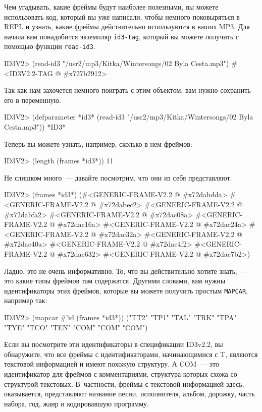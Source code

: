 Чем угадывать, какие фреймы будут наиболее полезными, вы можете использовать код, который
вы уже написали, чтобы немного поковыряться в REPL и узнать, какие фреймы действительно
используютcя в ваших MP3. Для начала вам понадобится экземпляр \lstinline{id3-tag}, который вы
можете получить с помощью функции \lstinline{read-id3}.

\begin{myverb}
ID3V2> (read-id3 "/usr2/mp3/Kitka/Wintersongs/02 Byla Cesta.mp3")
#<ID3V2.2-TAG @ #x727b2912>
\end{myverb}

Так как нам захочется немного поиграть с этим объектом, вам нужно сохранить его в переменную.

\begin{myverb}
ID3V2> (defparameter *id3* (read-id3 "/usr2/mp3/Kitka/Wintersongs/02 Byla Cesta.mp3"))
*ID3*
\end{myverb}

Теперь вы можете узнать, например, сколько в нем фреймов:

\begin{myverb}
ID3V2> (length (frames *id3*))
11
\end{myverb}

Не слишком много~--- давайте посмотрим, что они из себя представляют.

\begin{myverb}
ID3V2> (frames *id3*)
(#<GENERIC-FRAME-V2.2 @ #x72dabdda> #<GENERIC-FRAME-V2.2 @ #x72dabec2>
 #<GENERIC-FRAME-V2.2 @ #x72dabfa2> #<GENERIC-FRAME-V2.2 @ #x72dac08a>
 #<GENERIC-FRAME-V2.2 @ #x72dac16a> #<GENERIC-FRAME-V2.2 @ #x72dac24a>
 #<GENERIC-FRAME-V2.2 @ #x72dac32a> #<GENERIC-FRAME-V2.2 @ #x72dac40a>
 #<GENERIC-FRAME-V2.2 @ #x72dac4f2> #<GENERIC-FRAME-V2.2 @ #x72dac632>
 #<GENERIC-FRAME-V2.2 @ #x72dac7b2>)
\end{myverb}

Ладно, это не очень информативно. То, что вы действительно хотите знать,~--- это какие типы
фреймов там содержатся. Другими словами, вам нужны идентификаторы этих фреймов, которые вы
можете получить простым \lstinline{MAPCAR}, например так:

\begin{myverb}
ID3V2> (mapcar #'id (frames *id3*))
("TT2" "TP1" "TAL" "TRK" "TPA" "TYE" "TCO" "TEN" "COM" "COM" "COM")
\end{myverb}

Если вы посмотрите эти идентификаторы в спецификации ID3v2.2, вы обнаружите, что все
фреймы с идентификаторами, начинающимися с T, являются текстовой информацией и имеют
похожую структуру. А COM~--- это идентификатор для фреймов с комментариями, структура
которых схожа со структурой текстовых. В~частности, фреймы с текстовой информацией здесь,
оказывается, представляют название песни, исполнителя, альбом, дорожку, часть набора, год,
жанр и кодировавшую программу.

